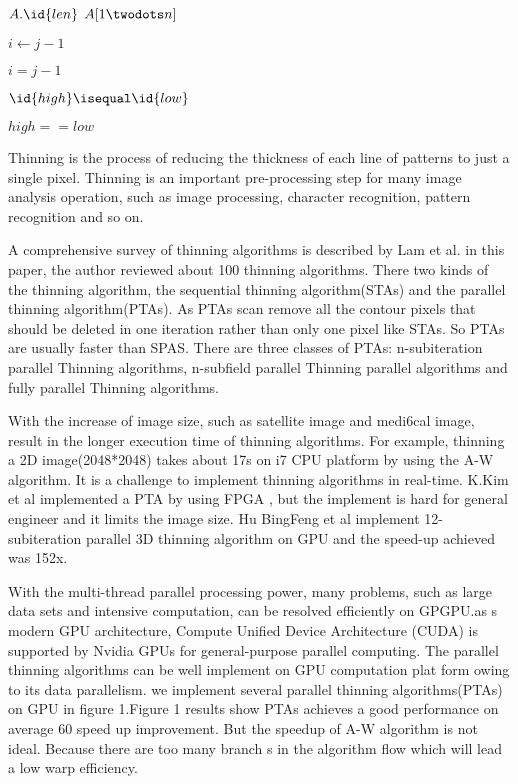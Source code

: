 \documentclass{sigplanconf}
\begin{document}
$A.\id{len}$
$A[1 \twodots n]$

$i \gets j - 1$

$i = j - 1$

$\id{high} \isequal \id{low} $

$high == low$


Thinning is the process of reducing the thickness of each line of patterns to just a single pixel. Thinning is an important pre-processing step for many image analysis operation, such as image processing, character recognition, pattern recognition and so on.

A comprehensive survey of thinning algorithms is described by Lam et al. in this paper, the author reviewed about 100 thinning algorithms. There two kinds of the thinning algorithm, the sequential thinning algorithm(STAs) and the parallel thinning algorithm(PTAs). As PTAs scan remove all the contour pixels that should be deleted in one iteration rather than only one pixel like STAs. So PTAs are usually faster than SPAS. There are three classes of PTAs: n-subiteration parallel Thinning algorithms, n-subfield parallel Thinning parallel algorithms and fully parallel Thinning algorithms. 

With the increase of image size, such as satellite image and medi6cal image, result in the longer execution time of thinning algorithms. For example, thinning a 2D image(2048*2048) takes about 17s on i7 CPU platform by using the A-W algorithm. It is a challenge to implement thinning algorithms in real-time. K.Kim et al implemented a PTA by using FPGA , but the implement is hard for general engineer and it limits the image size. Hu BingFeng et al implement 12- subiteration parallel 3D thinning algorithm on GPU and the speed-up achieved was 152x.

With the multi-thread parallel processing power, many problems, such as large data sets and intensive computation, can be resolved efficiently on GPGPU.as s modern GPU architecture, Compute Unified Device Architecture (CUDA) is supported by Nvidia GPUs for general-purpose parallel computing. The parallel thinning algorithms can be well implement on GPU computation plat form owing to its data parallelism. we implement several parallel thinning algorithms(PTAs) on GPU in figure 1.Figure 1 results show PTAs achieves a good performance on average 60 speed up improvement. But the speedup of A-W algorithm is not ideal. Because there are too many branch s in the algorithm flow which will lead a low warp efficiency. 
\end{document}
